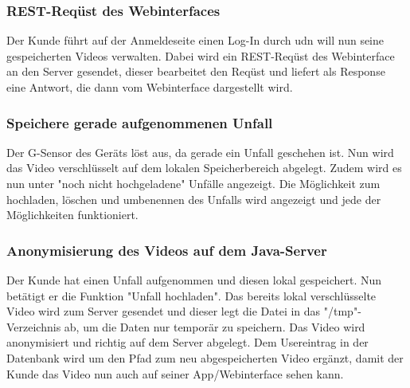 \subsubsection{REST-Req\"ust des Webinterfaces}
Der Kunde f\"uhrt auf der Anmeldeseite einen Log-In durch udn will nun seine gespeicherten Videos verwalten. Dabei wird ein REST-Req\"ust des Webinterface an den Server gesendet, dieser bearbeitet den Req\"ust und liefert als Response eine Antwort, die dann vom Webinterface dargestellt wird.

\subsubsection{Speichere gerade aufgenommenen Unfall}
Der G-Sensor des Ger\"ats l\"ost aus, da gerade ein Unfall geschehen ist. Nun wird das Video verschl\"usselt auf dem lokalen Speicherbereich abgelegt. Zudem wird es nun unter "noch nicht hochgeladene" Unf\"alle angezeigt. Die M\"oglichkeit zum hochladen, l\"oschen und umbenennen des Unfalls wird angezeigt und jede der M\"oglichkeiten funktioniert.

\subsubsection{Anonymisierung des Videos auf dem Java-Server}
Der Kunde hat einen Unfall aufgenommen und diesen lokal gespeichert. Nun bet\"atigt er die Funktion "Unfall hochladen". Das bereits lokal verschl\"usselte Video wird zum Server gesendet und dieser legt die Datei in das "/tmp"-Verzeichnis ab, um die Daten nur tempor\"ar zu speichern. Das Video wird anonymisiert und richtig auf dem Server abgelegt. Dem Usereintrag in der Datenbank wird um den Pfad zum neu abgespeicherten Video erg\"anzt, damit der Kunde das Video nun auch auf seiner App/Webinterface sehen kann.